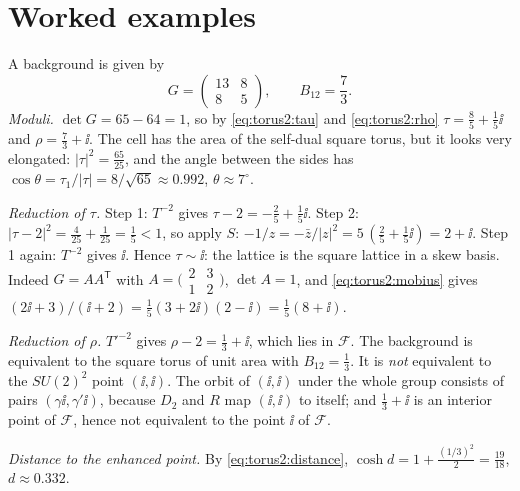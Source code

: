 \section{Worked examples}\label{sec:torus2:examples}

\begin{example}\label{ex:torus2:disguise}
A background is given by
\[
 G=\begin{pmatrix}13&8\\8&5\end{pmatrix},\qquad B_{12}=\frac73 .
\]
\emph{Moduli.} $\det G=65-64=1$, so by \eqref{eq:torus2:tau} and \eqref{eq:torus2:rho}
$\tau=\frac85+\frac15\ii$ and $\rho=\frac73+\ii$. The cell has the area of the self-dual
square torus, but it looks very elongated: $|\tau|^2=\frac{65}{25}$, and the angle between
the sides has $\cos\theta=\tau_1/|\tau|=8/\sqrt{65}\approx0.992$, $\theta\approx7^\circ$.

\emph{Reduction of $\tau$.} Step 1: $T^{-2}$ gives $\tau-2=-\frac25+\frac15\ii$. Step 2:
$|\tau-2|^2=\frac4{25}+\frac1{25}=\frac15<1$, so apply $S$:
$-1/z=-\bar z/|z|^2=5\,(\frac25+\frac15\ii)=2+\ii$. Step 1 again: $T^{-2}$ gives $\ii$. Hence
$\tau\sim\ii$: the lattice is the square lattice in a skew basis. Indeed
$G=AA^{\mathsf T}$ with $A=\big(\begin{smallmatrix}2&3\\1&2\end{smallmatrix}\big)$,
$\det A=1$, and \eqref{eq:torus2:mobius} gives $(2\ii+3)/(\ii+2)=\frac15(3+2\ii)(2-\ii)=
\frac15(8+\ii)$.

\emph{Reduction of $\rho$.} $T'^{-2}$ gives $\rho-2=\frac13+\ii$, which lies in $\mathcal F$.
The background is equivalent to the square torus of unit area with $B_{12}=\frac13$. It is
\emph{not} equivalent to the $SU(2)^2$ point $(\ii,\ii)$. The orbit of $(\ii,\ii)$ under
the whole group consists of pairs $(\gamma\ii,\gamma'\ii)$, because $D_2$ and $R$ map
$(\ii,\ii)$ to itself; and $\frac13+\ii$ is an interior point of $\mathcal F$, hence not
equivalent to the point $\ii$ of $\mathcal F$.

\emph{Distance to the enhanced point.} By \eqref{eq:torus2:distance},
$\cosh d=1+\frac{(1/3)^2}{2}=\frac{19}{18}$, $d\approx0.332$.
\end{example}

